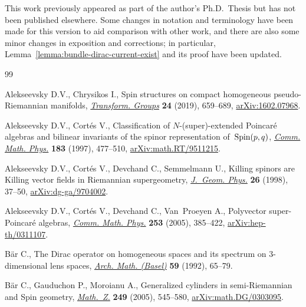 \documentclass[10pt,a4paper]{amsart}
\numberwithin{equation}{section}
\newcommand{\1}{\mathbbm{1}}
\begin{document}
This work previously appeared as part of the author's Ph.D.~Thesis \cite{Beckett2024} but has not been published elsewhere. Some changes in notation and terminology have been made for this version to aid comparison with other work, and there are also some minor changes in exposition and corrections; in particular, Lemma~\ref{lemma:bundle-dirac-current-exist} and its proof have been updated.

\begin{thebibliography}{99}
\footnotesize\itemsep=0pt

Alekseevsky D.V., Chrysikos I., Spin structures on compact homogeneous
 pseudo-{R}iemannian manifolds,
 \href{https://doi.org/10.1007/s00031-018-9498-1}{\textit{Transform. Groups}}
 \textbf{24} (2019), 659--689,
 \href{http://arxiv.org/abs/1602.07968}{arXiv:1602.07968}.

Alekseevsky D.V., Cort\'es V., Classification of {$N$}-(super)-extended
 {P}oincar\'e algebras and bilinear invariants of the spinor representation
 of~{${\rm Spin}(p,q)$},
 \href{https://doi.org/10.1007/s002200050039}{\textit{Comm. Math. Phys.}}
 \textbf{183} (1997), 477--510,
 \href{http://arxiv.org/abs/math.RT/9511215}{arXiv:math.RT/9511215}.

Alekseevsky D.V., Cort\'es V., Devchand C., Semmelmann U., Killing spinors are
 {K}illing vector fields in {R}iemannian supergeometry,
 \href{https://doi.org/10.1016/S0393-0440(97)00036-3}{\textit{J.~Geom. Phys.}}
 \textbf{26} (1998), 37--50,
 \href{http://arxiv.org/abs/dg-ga/9704002}{arXiv:dg-ga/9704002}.

Alekseevsky D.V., Cort\'es V., Devchand C., Van~Proeyen A., Polyvector
 super-{P}oincar\'e algebras,
 \href{https://doi.org/10.1007/s00220-004-1155-y}{\textit{Comm. Math. Phys.}}
 \textbf{253} (2005), 385--422,
 \href{http://arxiv.org/abs/hep-th/0311107}{arXiv:hep-th/0311107}.

B\"ar C., The {D}irac operator on homogeneous spaces and its spectrum on
 {$3$}-dimensional lens spaces,
 \href{https://doi.org/10.1007/BF01199016}{\textit{Arch. Math. (Basel)}}
 \textbf{59} (1992), 65--79.

B\"ar C., Gauduchon P., Moroianu A., Generalized cylinders in semi-{R}iemannian
 and {S}pin geometry,
 \href{https://doi.org/10.1007/s00209-004-0718-0}{\textit{Math.~Z.}}
 \textbf{249} (2005), 545--580,
 \href{http://arxiv.org/abs/math.DG/0303095}{arXiv:math.DG/0303095}.


\end{thebibliography}
\end{document}
